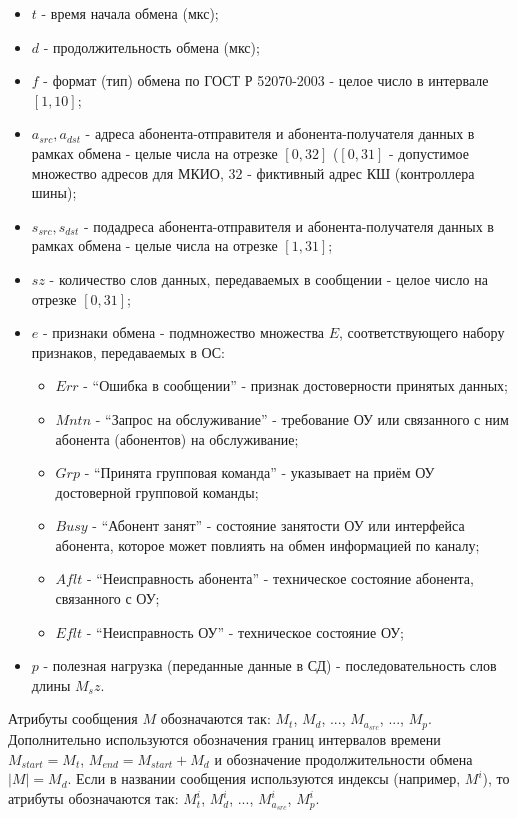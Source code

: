 \begin{itemize}
 \item $t$ - время начала обмена (мкс);
 \item $d$ - продолжительность обмена (мкс);
 \item $f$ - формат (тип) обмена по ГОСТ Р 52070-2003 - целое число в интервале 
$[1, 10]$;
 \item $a_{src}, a_{dst}$ - адреса абонента-отправителя и абонента-получателя 
данных в рамках обмена - целые числа на отрезке $[0, 32]$ ($[0, 31]$ - 
допустимое множество адресов для МКИО, $32$ - фиктивный адрес КШ (контроллера 
шины);
 \item $s_{src}, s_{dst}$ - подадреса абонента-отправителя и 
абонента-получателя данных в рамках обмена - целые числа на отрезке $[1, 31]$;
 \item $sz$ - количество слов данных, передаваемых в сообщении - целое число на 
отрезке $[0, 31]$;
 \item $e$ - признаки обмена - подмножество множества $E$, 
соответствующего набору признаков, передаваемых в ОС:
 \begin{itemize}
  \item $Err$ - ``Ошибка в сообщении'' - признак достоверности принятых данных;
  \item $Mntn$ - ``Запрос на обслуживание'' - требование ОУ или связанного с 
ним абонента (абонентов) на обслуживание;
  \item $Grp$ - ``Принята групповая команда'' - указывает на приём ОУ 
достоверной групповой команды;
  \item $Busy$ - ``Абонент занят'' - состояние занятости ОУ или интерфейса 
абонента, которое может повлиять на обмен информацией по каналу;
  \item $Aflt$ - ``Неисправность абонента'' - техническое состояние абонента, 
связанного с ОУ;
  \item $Eflt$ - ``Неисправность ОУ'' - техническое состояние ОУ;
 \end{itemize}
 \item $p$ - полезная нагрузка (переданные данные в СД) - последовательность 
слов длины $M_sz$.
\end{itemize}

Атрибуты сообщения $M$ обозначаются так: $M_t$, $M_d$, ..., $M_{a_{src}}$, ..., 
$M_p$. Дополнительно используются обозначения границ интервалов времени 
$M_{start} = M_t$, $M_{end} = M_{start} + M_d$ и обозначение продолжительности 
обмена $|M| = M_d$. Если в названии сообщения используются индексы (например, 
$M^i$), то атрибуты обозначаются так: $M^i_t$, $M^i_d$, ..., 
$M^i_{a_{src}}$, $M^i_p$.


